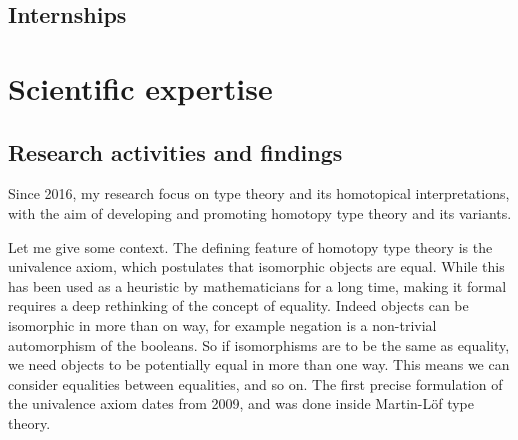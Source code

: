 \documentclass{article}
\begin{document}

\subsection{Internships}

\begin{itemize}
\end{itemize}

\section{Scientific expertise}

\subsection{Research activities and findings}

Since 2016, my research focus on type theory and its homotopical interpretations, with the aim of developing and promoting homotopy type theory and its variants. 

Let me give some context. The defining feature of homotopy type theory is the univalence axiom, which postulates that isomorphic objects are equal. While this has been used as a heuristic by mathematicians for a long time, making it formal requires a deep rethinking of the concept of equality. Indeed objects can be isomorphic in more than on way, for example negation is a non-trivial automorphism of the booleans. So if isomorphisms are to be the same as equality, we need objects to be potentially equal in more than one way. This means we can consider equalities between equalities, and so on. The first precise formulation of the univalence axiom dates from 2009, and was done inside Martin-L\"of type theory. 
\end{document}
